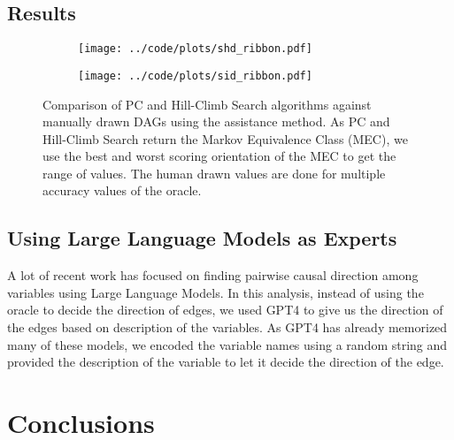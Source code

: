 \documentclass[letterpaper]{article} %
\begin{document}
\subsection{Results}
\begin{figure}
	\begin{subfigure}{0.5\textwidth}
		\centering
		\texttt{[image: ../code/plots/shd\_ribbon.pdf]}
		\caption{}
	\end{subfigure}
	\begin{subfigure}{0.5\textwidth}
		\centering
		\texttt{[image: ../code/plots/sid\_ribbon.pdf]}
		\caption{}
	\end{subfigure}
	\caption{Comparison of PC and Hill-Climb Search algorithms against
		manually drawn DAGs using the assistance method. As PC and
		Hill-Climb Search return the Markov Equivalence Class (MEC), we
		use the best and worst scoring orientation of the MEC to get
		the range of values. The human drawn values are done for
		multiple accuracy values of the oracle.}
\end{figure}

\subsection{Using Large Language Models as Experts}
A lot of recent work has focused on finding pairwise causal direction among
variables using Large Language Models. In this analysis, instead of using the
oracle to decide the direction of edges, we used GPT4 to give us the direction
of the edges based on description of the variables. As GPT4 has already
memorized many of these models, we encoded the variable names using a random
string and provided the description of the variable to let it decide the
direction of the edge.

\section{Conclusions}


\end{document}
